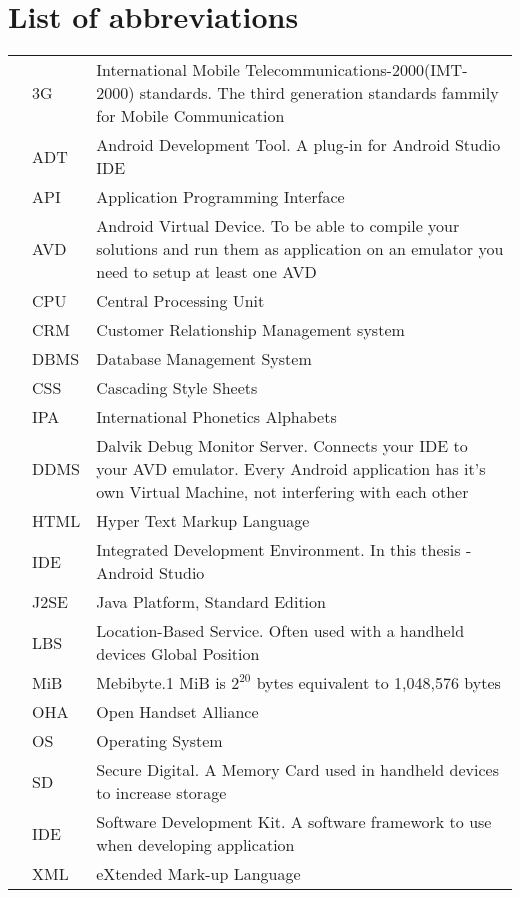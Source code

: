 \chapter*{List of abbreviations}

{\centering
\begin{longtable}{@{}p{2 cm}@{}p{2 cm}@{}p{10 cm}@{}}

&3G&International Mobile Telecommunications-2000(IMT-2000) standards. The third generation standards fammily for Mobile Communication\\

&ADT&Android Development Tool. A plug-in for Android Studio IDE\\

&API&Application Programming Interface\\

&AVD&Android Virtual Device. To be able to compile your solutions and run them as application on an emulator you need to setup at least one AVD\\

&CPU&Central Processing Unit\\

&CRM&Customer Relationship Management system \\

&DBMS&Database Management System\\

&CSS&Cascading Style Sheets \\

&IPA&International Phonetics Alphabets\\

&DDMS& Dalvik Debug Monitor Server. Connects your IDE to your AVD emulator. Every Android application has it's own Virtual Machine, not interfering with each other\\

&HTML&Hyper Text Markup Language\\

&IDE&Integrated Development Environment. In this thesis -Android Studio\\

&J2SE&Java Platform, Standard Edition\\

&LBS&Location-Based Service. Often used with a handheld devices Global Position\\

&MiB&Mebibyte.1 MiB is $2^{20}$ bytes equivalent to 1,048,576 bytes\\

&OHA&Open Handset Alliance\\
&OS&Operating System\\

&SD&Secure Digital. A Memory Card used in handheld devices to increase storage\\

&IDE &Software Development Kit. A software framework to use when developing application\\

&XML&eXtended Mark-up Language\\


\end{longtable}}

